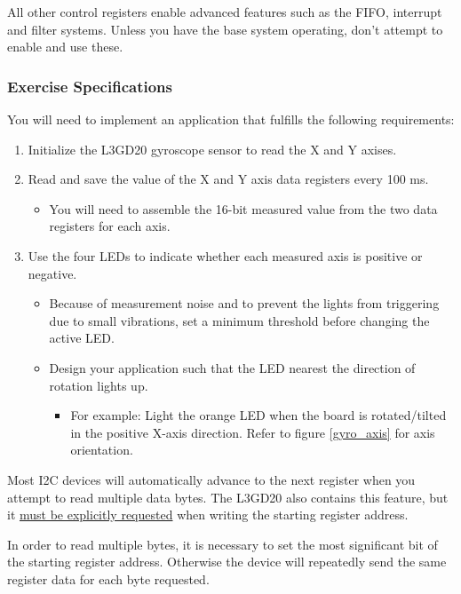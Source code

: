 \documentclass[11pt,fleqn]{book} %
\begin{document}
All other control registers enable advanced features such as the FIFO, interrupt and filter systems. Unless you have the base system operating, don't attempt to enable and use these. 

\subsubsection{Exercise Specifications}
You will need to implement an application that fulfills the following requirements:
\begin{enumerate}
    \item Initialize the L3GD20 gyroscope sensor to read the X and Y axises.
    \item Read and save the value of the X and Y axis data registers every 100 ms.
    \begin{itemize}
        \item You will need to assemble the 16-bit measured value from the two data registers for each axis. 
    \end{itemize}
    \item Use the four LEDs to indicate whether each measured axis is positive or negative. 
    \begin{itemize}
        \item Because of measurement noise and to prevent the lights from triggering due to small vibrations, set a minimum threshold before changing the active LED.
        \item Design your application such that the LED nearest the direction of rotation lights up.
        \begin{itemize}
            \item For example: Light the orange LED when the board is rotated/tilted in the positive X-axis direction. Refer to figure \ref{gyro_axis} for axis orientation. 
        \end{itemize} 
    \end{itemize}
\end{enumerate}

\begin{warning}
    Most I2C devices will automatically advance to the next register when you attempt to read multiple data bytes. The L3GD20 also contains this feature, but it \underline{must be explicitly requested} when writing the starting register address. 
    
    In order to read multiple bytes, it is necessary to set the most significant bit of the starting register address. Otherwise the device will repeatedly send the same register data for each byte requested.
\end{warning}
\end{document}
